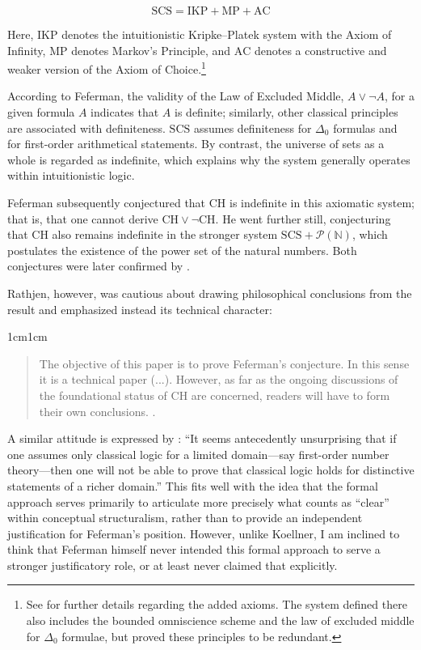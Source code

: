 \documentclass[11pt,a4paper]{article}
\theoremstyle{plain}
\begin{document}
\begin{equation}
\mathrm{SCS} = \mathrm{IKP} + \mathrm{MP} + \mathrm{AC}
\end{equation}

Here, $\mathrm{IKP}$ denotes the intuitionistic Kripke–Platek system with the Axiom of Infinity, $\mathrm{MP}$ denotes Markov's Principle, and $\mathrm{AC}$ denotes a constructive and weaker version of the Axiom of Choice.\footnote{See \textcite[Section 6]{Feferman2010} for further details regarding the added axioms. The system defined there also includes the bounded omniscience scheme and the law of excluded middle for $\Delta_0$ formulae, but \textcite{Rathjen2016} proved these principles to be redundant.}

According to Feferman, the validity of the Law of Excluded Middle, $A \lor \neg A$, for a given formula $A$ indicates that $A$ is definite; similarly, other classical principles are associated with definiteness. $\mathrm{SCS}$ assumes definiteness for $\Delta_0$ formulas and for first-order arithmetical statements. By contrast, the universe of sets as a whole is regarded as indefinite, which explains why the system generally operates within intuitionistic logic.

Feferman subsequently conjectured that CH is indefinite in this axiomatic system; that is, that one cannot derive $\mathrm{CH} \lor \neg \mathrm{CH}$. He went further still, conjecturing that CH also remains indefinite in the stronger system $\mathrm{SCS} + \mathcal{P}(\mathbb{N})$, which postulates the existence of the power set of the natural numbers. Both conjectures were later confirmed by \parencite{Rathjen2016}.

Rathjen, however, was cautious about drawing philosophical conclusions from the result and emphasized instead its technical character:

\begin{adjustwidth}{1cm}{1cm}
\begin{quote}
\small
The objective of this paper is to prove Feferman's conjecture. In this sense it is a technical paper (...). However, as far as the ongoing discussions of the foundational status of CH are concerned, readers will have to form their own conclusions. \parencite[p. 743]{Rathjen2016}.
\end{quote}
\end{adjustwidth}

A similar attitude is expressed by \textcite[p. 516]{Koellner2016}: “It seems antecedently unsurprising that if one assumes only classical logic for a limited domain—say first-order number theory—then one will not be able to prove that classical logic holds for distinctive statements of a richer domain.” This fits well with the idea that the formal approach serves primarily to articulate more precisely what counts as “clear” within conceptual structuralism, rather than to provide an independent justification for Feferman's position. However, unlike Koellner, I am inclined to think that Feferman himself never intended this formal approach to serve a stronger justificatory role, or at least never claimed that explicitly.
\end{document}
